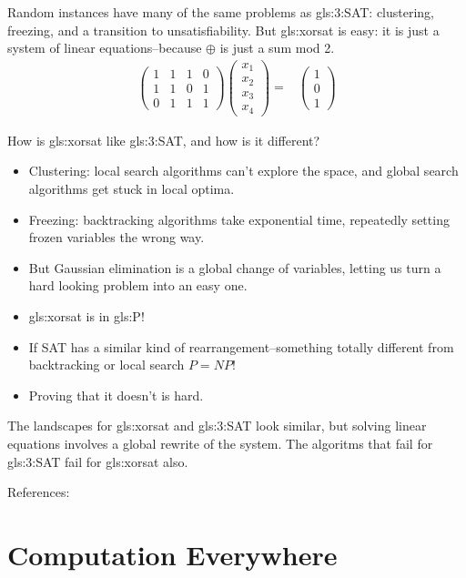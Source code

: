 \documentclass[]{article}
\begin{document}
Random instances have many of the same problems as \gls{gls:3:SAT}: clustering, freezing, and a transition to unsatisfiability. But \gls{gls:xorsat} is easy: it is just a system of linear equations--because $\oplus$ is just a sum mod 2.
\begin{align*}
	\begin{pmatrix}
		1&1&1&0\\
		1&1&0&1\\
		0&1&1&1
	\end{pmatrix}\begin{pmatrix}
		x_1\\
		x_2\\
		x_3\\
		x_4
	\end{pmatrix}=&\begin{pmatrix}
		1\\
		0\\
		1
	\end{pmatrix}
\end{align*}

How is \gls{gls:xorsat} like \gls{gls:3:SAT}, and how is it different?
\begin{itemize}
	\item Clustering: local search algorithms can't explore the space, and global search algorithms get stuck in local optima.
	\item Freezing: backtracking algorithms take exponential time, repeatedly setting frozen variables the wrong way.
	\item 	But Gaussian elimination is a global change of variables, letting us turn a hard looking problem into an easy one.
	\item \gls{gls:xorsat} is in \gls{gls:P}!
	\item If SAT has a similar kind of rearrangement--something totally different from backtracking or local search $P=NP$!
	\item Proving that it doesn't is hard.
\end{itemize}

The landscapes for \gls{gls:xorsat} and \gls{gls:3:SAT} look similar, but solving linear equations involves a global rewrite of the system. The algoritms that fail for \gls{gls:3:SAT} fail for \gls{gls:xorsat} also.

References: \cite[Chapters 5,10]{moore2011nature}

\section{Computation Everywhere}
\end{document}
